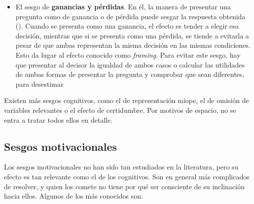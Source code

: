 \documentclass[a4paper,11pt]{article}
\begin{document}
\begin{itemize}
\item El sesgo de \textbf{ganancias y pérdidas}. En él, la manera de presentar una pregunta como de ganancia o de pérdida puede sesgar la respuesta obtenida (\cite{tversky1981}). Cuando se presenta como una ganancia, el efecto es tender a elegir esa decisión, mientras que si se presenta como una pérdida, se tiende a evitarla a pesar de que ambas representan la misma decisión en las mismas condiciones. Esto da lugar al efecto conocido como \textit{framing}. Para evitar este sesgo, hay que presentar al decisor la igualdad de ambos casos o calcular las utilidades de ambas formas de presentar la pregunta y comprobar que sean diferentes, para desestimar

\end{itemize}

Existen más sesgos cognitivos, como el de representación miope, el de omisión de variables relevantes o el efecto de certidumbre. Por motivos de espacio, no se entra a tratar todos ellos en detalle.
\subsection{Sesgos motivacionales}
Los sesgos motivacionales no han sido tan estudiados en la literatura, pero su efecto es tan relevante como el de los cognitivos. Son en general más complicados de resolver, y quien los comete no tiene por qué ser consciente de su inclinación hacia ellos. Algunos de los más conocidos son:
\end{document}
